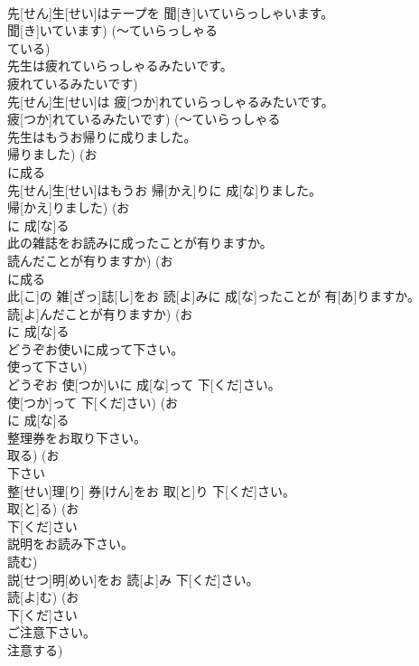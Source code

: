 \documentclass[8pt]{extreport}
\begin{document}
\begin{CJK}{UTF8}{min}
\\	先[せん]生[せい]はテープを 聞[き]いていらっしゃいます。 
\\	聞[き]いています) (〜ていらっしゃる 
\\	ている)
\\	先生は疲れていらっしゃるみたいです。 
\\	疲れているみたいです)	
\\	先[せん]生[せい]は 疲[つか]れていらっしゃるみたいです。 
\\	疲[つか]れているみたいです) (〜ていらっしゃる 
\\	先生はもうお帰りに成りました。 
\\	帰りました) (お 
\\	に成る 
\\	先[せん]生[せい]はもうお 帰[かえ]りに 成[な]りました。 
\\	帰[かえ]りました) (お 
\\	に 成[な]る 
\\	此の雑誌をお読みに成ったことが有りますか。 
\\	読んだことが有りますか) (お 
\\	に成る 
\\	此[こ]の 雑[ざっ]誌[し]をお 読[よ]みに 成[な]ったことが 有[あ]りますか。 
\\	読[よ]んだことが有りますか) (お 
\\	に 成[な]る 
\\	どうぞお使いに成って下さい。 
\\	使って下さい)	
\\	どうぞお 使[つか]いに 成[な]って 下[くだ]さい。 
\\	使[つか]って 下[くだ]さい) (お 
\\	に 成[な]る 
\\	整理券をお取り下さい。 
\\	取る) (お 
\\	下さい 
\\	整[せい]理[り] 券[けん]をお 取[と]り 下[くだ]さい。 
\\	取[と]る) (お 
\\	下[くだ]さい 
\\	説明をお読み下さい。 
\\	読む)	
\\	説[せつ]明[めい]をお 読[よ]み 下[くだ]さい。 
\\	読[よ]む) (お 
\\	下[くだ]さい 
\\	ご注意下さい。 
\\	注意する)	

\end{CJK}
\end{document}
